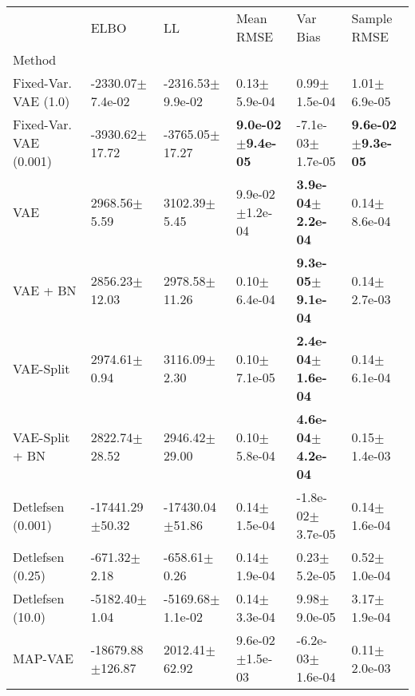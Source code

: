 \begin{tabular}{llllll}
\toprule
{} &                       ELBO &                         LL &                     Mean RMSE &                       Var Bias &                   Sample RMSE \\
Method                 &                            &                            &                               &                                &                               \\
\midrule
Fixed-Var. VAE (1.0)   &       -2330.07$\pm$7.4e-02 &       -2316.53$\pm$9.9e-02 &              0.13$\pm$5.9e-04 &               0.99$\pm$1.5e-04 &              1.01$\pm$6.9e-05 \\
Fixed-Var. VAE (0.001) &         -3930.62$\pm$17.72 &         -3765.05$\pm$17.27 &  \textbf{9.0e-02$\pm$9.4e-05} &           -7.1e-03$\pm$1.7e-05 &  \textbf{9.6e-02$\pm$9.3e-05} \\
VAE                    &           2968.56$\pm$5.59 &           3102.39$\pm$5.45 &           9.9e-02$\pm$1.2e-04 &   \textbf{3.9e-04$\pm$2.2e-04} &              0.14$\pm$8.6e-04 \\
VAE + BN               &          2856.23$\pm$12.03 &          2978.58$\pm$11.26 &              0.10$\pm$6.4e-04 &   \textbf{9.3e-05$\pm$9.1e-04} &              0.14$\pm$2.7e-03 \\
VAE-Split              &           2974.61$\pm$0.94 &           3116.09$\pm$2.30 &              0.10$\pm$7.1e-05 &   \textbf{2.4e-04$\pm$1.6e-04} &              0.14$\pm$6.1e-04 \\
VAE-Split + BN         &          2822.74$\pm$28.52 &          2946.42$\pm$29.00 &              0.10$\pm$5.8e-04 &   \textbf{4.6e-04$\pm$4.2e-04} &              0.15$\pm$1.4e-03 \\
Detlefsen (0.001)      &        -17441.29$\pm$50.32 &        -17430.04$\pm$51.86 &              0.14$\pm$1.5e-04 &           -1.8e-02$\pm$3.7e-05 &              0.14$\pm$1.6e-04 \\
Detlefsen (0.25)       &           -671.32$\pm$2.18 &           -658.61$\pm$0.26 &              0.14$\pm$1.9e-04 &               0.23$\pm$5.2e-05 &              0.52$\pm$1.0e-04 \\
Detlefsen (10.0)       &          -5182.40$\pm$1.04 &       -5169.68$\pm$1.1e-02 &              0.14$\pm$3.3e-04 &               9.98$\pm$9.0e-05 &              3.17$\pm$1.9e-04 \\
MAP-VAE                &       -18679.88$\pm$126.87 &          2012.41$\pm$62.92 &           9.6e-02$\pm$1.5e-03 &           -6.2e-03$\pm$1.6e-04 &              0.11$\pm$2.0e-03 \\

\end{tabular}
